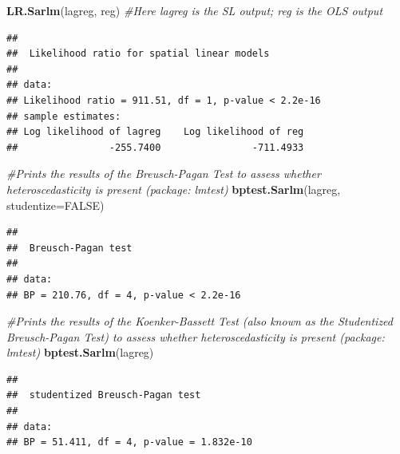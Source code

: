 \documentclass[
]{article}
\newenvironment{Shaded}{\begin{snugshade}}{\end{snugshade}}
\newcommand{\AttributeTok}[1]{\textcolor[rgb]{0.13,0.29,0.53}{#1}}
\newcommand{\CommentTok}[1]{\textcolor[rgb]{0.56,0.35,0.01}{\textit{#1}}}
\newcommand{\ConstantTok}[1]{\textcolor[rgb]{0.56,0.35,0.01}{#1}}
\newcommand{\FunctionTok}[1]{\textcolor[rgb]{0.13,0.29,0.53}{\textbf{#1}}}
\newcommand{\NormalTok}[1]{#1}
\newcommand{\SpecialCharTok}[1]{\textcolor[rgb]{0.81,0.36,0.00}{\textbf{#1}}}
\begin{document}
\begin{Shaded}
\begin{Highlighting}[]
\FunctionTok{LR.Sarlm}\NormalTok{(lagreg, reg) }\CommentTok{\#Here lagreg is the SL output; reg is the OLS output}
\end{Highlighting}
\end{Shaded}

\begin{verbatim}
## 
##  Likelihood ratio for spatial linear models
## 
## data:  
## Likelihood ratio = 911.51, df = 1, p-value < 2.2e-16
## sample estimates:
## Log likelihood of lagreg    Log likelihood of reg 
##                -255.7400                -711.4933
\end{verbatim}

\begin{Shaded}
\begin{Highlighting}[]
\CommentTok{\#Prints the results of the Breusch{-}Pagan Test to assess whether heteroscedasticity is present (package: lmtest)}
\FunctionTok{bptest.Sarlm}\NormalTok{(lagreg, }\AttributeTok{studentize=}\ConstantTok{FALSE}\NormalTok{)}
\end{Highlighting}
\end{Shaded}

\begin{verbatim}
## 
##  Breusch-Pagan test
## 
## data:  
## BP = 210.76, df = 4, p-value < 2.2e-16
\end{verbatim}

\begin{Shaded}
\begin{Highlighting}[]
\CommentTok{\#Prints the results of the Koenker{-}Bassett Test (also known as the Studentized Breusch{-}Pagan Test) to assess whether heteroscedasticity is present (package: lmtest)}
\FunctionTok{bptest.Sarlm}\NormalTok{(lagreg)     }
\end{Highlighting}
\end{Shaded}

\begin{verbatim}
## 
##  studentized Breusch-Pagan test
## 
## data:  
## BP = 51.411, df = 4, p-value = 1.832e-10
\end{verbatim}

\begin{Shaded}
\end{Shaded}
\end{document}
